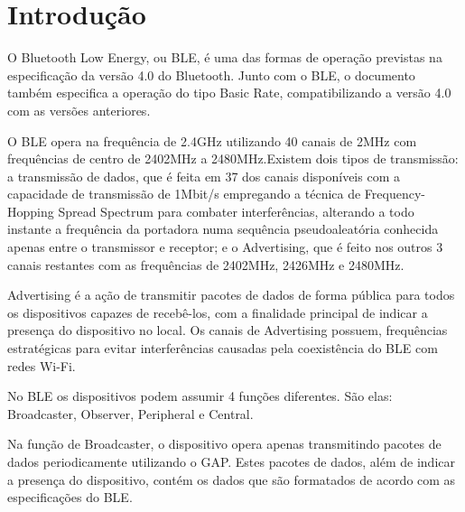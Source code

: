 \section{Introdução}









O Bluetooth Low Energy, ou BLE, é uma das formas de operação previstas na
especificação da versão 4.0 do Bluetooth. Junto com o BLE, o documento também
especifica a operação do tipo Basic Rate, compatibilizando a versão 4.0 com as
versões anteriores.


O BLE opera na frequência de 2.4GHz utilizando 40 canais de 2MHz com
frequências de centro de 2402MHz a 2480MHz.Existem dois tipos de transmissão: a
transmissão de dados, que é feita em 37 dos canais disponíveis com a capacidade
de transmissão de 1Mbit/s empregando a técnica de Frequency-Hopping Spread
Spectrum para combater interferências, alterando a todo instante a frequência
da portadora numa sequência pseudoaleatória conhecida apenas entre o
transmissor e receptor; e o Advertising, que é feito nos outros 3 canais
restantes com as frequências de 2402MHz, 2426MHz e 2480MHz.

Advertising é a ação de transmitir pacotes de dados de forma pública para todos
os dispositivos capazes de recebê-los, com a finalidade principal de indicar a
presença do dispositivo no local.
Os canais de Advertising possuem, frequências estratégicas para evitar
interferências causadas pela coexistência do BLE com redes Wi-Fi.



No BLE os dispositivos podem assumir 4 funções diferentes. São elas:
Broadcaster, Observer, Peripheral e Central.

Na função de Broadcaster, o dispositivo opera apenas transmitindo pacotes de
dados periodicamente utilizando o GAP. Estes pacotes de dados, além de indicar
a presença do dispositivo, contém os dados que são formatados de acordo com as
especificações do BLE.

